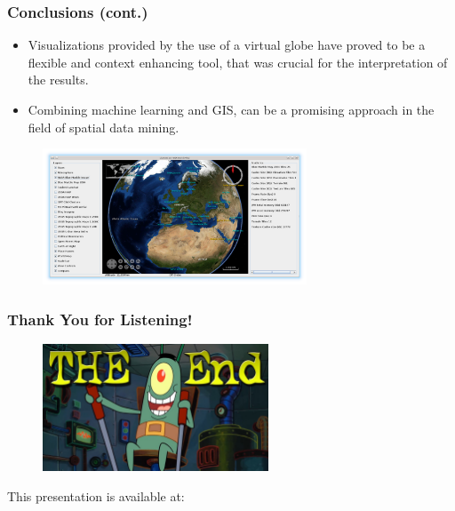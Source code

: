 \documentclass[hyperref={pdfpagelabels=true}]{beamer}
\begin{document}
\begin{frame}
\frametitle{Conclusions (cont.)}
    \begin{itemize}    
      \item<1->Visualizations provided by the use of a virtual globe have proved to be a flexible and context enhancing tool, that was crucial for the interpretation of the results.
      \item<1->Combining machine learning and GIS, can be a promising approach in the field of spatial data mining.
     \end{itemize}
     
      \begin{figure}  
	\includegraphics[width=0.7\textwidth]{bluemarble.png}
       \end{figure}  
          
\end{frame}

\begin{frame}
\frametitle{Thank You for Listening!}
    \begin{figure}   
      \includegraphics[width=0.6\textwidth]{end.jpg}      
    \end{figure}   
    This presentation is available at: 
      \vspace{5mm}    
\end{frame}
\end{document}
